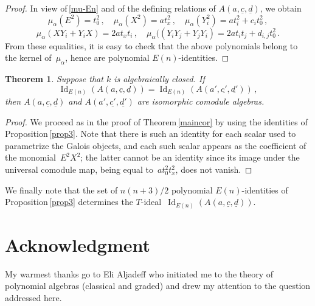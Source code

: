 \documentclass[11pt, a4paper]{amsart}
\newtheorem{theorem}{Theorem}[section]
\theoremstyle{definition}
\numberwithin{equation}{section}
\begin{document}
\begin{proof}
In view of\,\eqref{mu-En} and of the defining relations of $A(a,\underline{c}, \underline{d})$, we obtain
\begin{equation*}
\mu_{\alpha}(E^2) =  t_0^2 \, , \quad
\mu_{\alpha}(X^2) =  at_x^2 \, , \quad
\mu_{\alpha}(Y_i^2) = a t_i^2 + c_i t_0^2 \, ,
\end{equation*}
\begin{equation*}
\mu_{\alpha}(XY_i+Y_iX) = 2 a t_x t_i \, , \quad
\mu_{\alpha}((Y_iY_j + Y_jY_i) = 2a t_i t_j + d_{i,j} t_0^2 \, .
\end{equation*}
From these equalities, it is easy to check that the above polynomials belong to the kernel of~$\mu_{\alpha}$,
hence are polynomial $E(n)$-identities.
\end{proof}

\begin{theorem}\label{mainth3}
Suppose that $k$ is algebraically closed.
If 
\[\operatorname{Id}_{E(n)}(A(a,\underline{c}, \underline{d})) = \operatorname{Id}_{E(n)}(A(a',\underline{c'}, \underline{d'}))\, ,
\] 
then $A(a,\underline{c}, \underline{d})$ and $A(a',\underline{c'}, \underline{d'})$ are isomorphic comodule algebras.
\end{theorem} 

\begin{proof}
We proceed as in the proof of Theorem\,\ref{maincor} by using the identities of Proposition\,\ref{prop3}. Note that there is 
such an identity for each scalar used to parametrize the Galois objects, and each such scalar appears
as the coefficient of the monomial~$E^2 X^2$; the latter cannot be an identity since its image under the 
universal comodule map, being equal to~$a t_0^2 t_x^2$, does not vanish.
\end{proof}

We finally note that the set of $n(n+3)/2$  polynomial $E(n)$-identities of Proposition\,\ref{prop3}
determines the $T$-ideal~$\operatorname{Id}_{E(n)}(A(a,\underline{c}, \underline{d}))$.

\section*{Acknowledgment}
My warmest thanks go to Eli Aljadeff who initiated me to the theory of polynomial algebras (classical and graded)
and drew my attention to the question addressed here.
\end{document}
